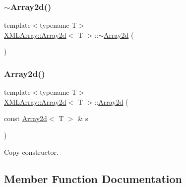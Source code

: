 \subsubsection{\texorpdfstring{$\sim$Array2d()}{~Array2d()}\hspace{0.1cm}{\footnotesize\ttfamily [3/3]}}
{\footnotesize\ttfamily template$<$typename T$>$ \\
\mbox{\hyperlink{classXMLArray_1_1Array2d}{X\+M\+L\+Array\+::\+Array2d}}$<$ T $>$\+::$\sim$\mbox{\hyperlink{classXMLArray_1_1Array2d}{Array2d}} (\begin{DoxyParamCaption}{ }\end{DoxyParamCaption})\hspace{0.3cm}{\ttfamily [inline]}}

\mbox{\label{classXMLArray_1_1Array2d_a0646ba9d0ce7616c1cc4a84a4794b186}} 
\subsubsection{\texorpdfstring{Array2d()}{Array2d()}\hspace{0.1cm}{\footnotesize\ttfamily [9/9]}}
{\footnotesize\ttfamily template$<$typename T$>$ \\
\mbox{\hyperlink{classXMLArray_1_1Array2d}{X\+M\+L\+Array\+::\+Array2d}}$<$ T $>$\+::\mbox{\hyperlink{classXMLArray_1_1Array2d}{Array2d}} (\begin{DoxyParamCaption}\item[{const \mbox{\hyperlink{classXMLArray_1_1Array2d}{Array2d}}$<$ T $>$ \&}]{s }\end{DoxyParamCaption})\hspace{0.3cm}{\ttfamily [inline]}}



Copy constructor. 



\subsection{Member Function Documentation}
\mbox{\label{classXMLArray_1_1Array2d_a9eecadb91fe97638a8d7adce77b0a562}} 
